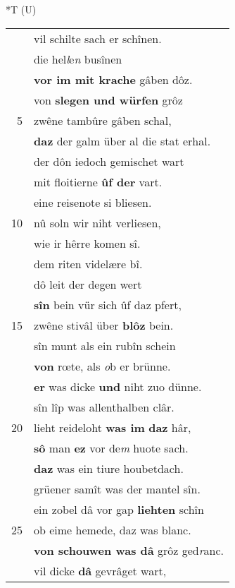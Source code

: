 \documentclass[8pt,a4paper,notitlepage]{article}
\begin{document}
\begin{table}[ht]
\begin{minipage}[t]{0.5\linewidth}
\end{minipage}
\hspace{0.5cm}
\begin{minipage}[t]{0.5\linewidth}
\small
\begin{center}*T (U)
\end{center}
\begin{tabular}{rl}
 & vil schilte sach er schînen.\\ 
 & die hel\textit{l}e\textit{n} busînen\\ 
 & \textbf{vor im mit krache} gâben dôz.\\ 
 & von \textbf{slegen und würfen} grôz\\ 
5 & zwêne tambûre gâben schal,\\ 
 & \textbf{daz} der galm über al die stat erhal.\\ 
 & der dôn iedoch gemischet wart\\ 
 & mit floitierne \textbf{ûf der} vart.\\ 
 & eine reisenote si bliesen.\\ 
10 & nû soln wir niht verliesen,\\ 
 & wie ir hêrre komen sî.\\ 
 & dem riten videlære bî.\\ 
 & dô leit der degen wert\\ 
 & \textbf{sîn} bein vür sich ûf daz pfert,\\ 
15 & zwêne stivâl über \textbf{blôz} bein.\\ 
 & sîn munt als ein rubîn schein\\ 
 & \textbf{von} rœte, als \textit{o}b er brünne.\\ 
 & \textbf{er} was dicke \textbf{und} niht zuo dünne.\\ 
 & sîn lîp was allenthalben clâr.\\ 
20 & lieht reideloht \textbf{was im} \textbf{daz} hâr,\\ 
 & \textbf{sô} man \textbf{ez} vor de\textit{m} huote sach.\\ 
 & \textbf{daz} was ein tiure houbetdach.\\ 
 & grüener samît was der mantel sîn.\\ 
 & ein zobel dâ vor gap \textbf{liehten} schîn\\ 
25 & ob eime hemede, daz was blanc.\\ 
 & \textbf{von schouwen was dâ} grôz ged\textit{r}anc.\\ 
 & vil dicke \textbf{dâ} gevrâget wart,\\ 

\end{tabular}
\end{minipage}
\end{table}
\end{document}
